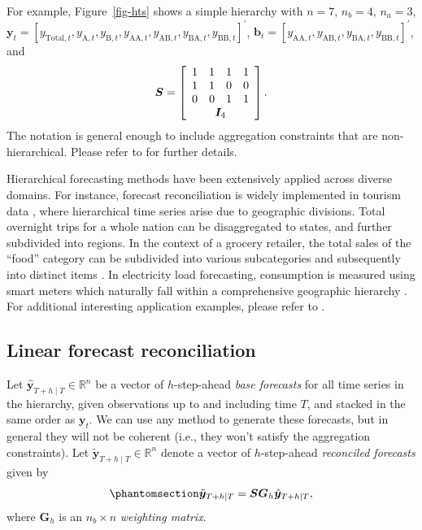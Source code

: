 \documentclass[
  11pt]{article}
\theoremstyle{plain}
\theoremstyle{remark}
\begin{document}
For example, Figure~\ref{fig-hts} shows a simple hierarchy with
\(n = 7\), \(n_b = 4\), \(n_a = 3\),
\(\bm{y}_t = [y_{\text{Total},t}, y_{\text{A},t}, y_{\text{B},t}, y_{\text{AA},t}, y_{\text{AB},t}, y_{\text{BA},t}, y_{\text{BB},t}]^{\prime}\),
\(\bm{b}_t = [y_{\text{AA},t}, y_{\text{AB},t}, y_{\text{BA},t}, y_{\text{BB},t}]^{\prime}\),
and \[
\bm{S} = \left[
\begin{array}{cccc}
1 & 1 & 1 & 1 \\
1 & 1 & 0 & 0 \\
0 & 0 & 1 & 1 \\
\multicolumn{4}{c}{\bm{I}_4}
\end{array}\right].
\] The notation is general enough to include aggregation constraints
that are non-hierarchical. Please refer to \citet{Hyndman2021-fo} for
further details.

Hierarchical forecasting methods have been extensively applied across
diverse domains. For instance, forecast reconciliation is widely
implemented in tourism data \citep{Athanasopoulos2009-ps}, where
hierarchical time series arise due to geographic divisions. Total
overnight trips for a whole nation can be disaggregated to states, and
further subdivided into regions. In the context of a grocery retailer,
the total sales of the ``food'' category can be subdivided into various
subcategories and subsequently into distinct items
\citep{Zhang2023-op, Hollyman2021-un}. In electricity load forecasting,
consumption is measured using smart meters which naturally fall within a
comprehensive geographic hierarchy \citep{Taieb2021-tc}. For additional
interesting application examples, please refer to
\citet{Athanasopoulos2024-sm}.

\subsection{Linear forecast
reconciliation}\label{linear-forecast-reconciliation}

Let \(\hat{\bm{y}}_{T+h \mid T} \in \mathbb{R}^n\) be a vector of
\(h\)-step-ahead \emph{base forecasts} for all time series in the
hierarchy, given observations up to and including time \(T\), and
stacked in the same order as \(\bm{y}_t\). We can use any method to
generate these forecasts, but in general they will not be coherent
(i.e., they won't satisfy the aggregation constraints). Let
\(\tilde{\bm{y}}_{T+h \mid T} \in \mathbb{R}^n\) denote a vector of
\(h\)-step-ahead \emph{reconciled forecasts} given by
\begin{equation}\phantomsection\label{eq-lr}{
\tilde{\bm{y}}_{T+h \mid T} = \bm{S}\bm{G}_h\hat{\bm{y}}_{T+h \mid T},
}\end{equation} where \(\bm{G}_h\) is an \(n_b \times n\)
\emph{weighting matrix}.
\end{document}
